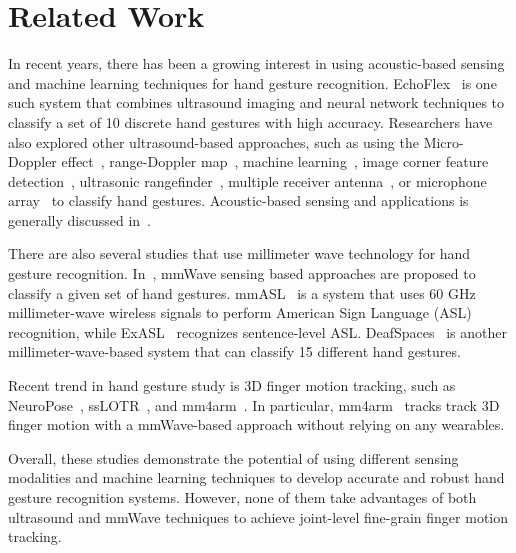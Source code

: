 \documentclass[11pt, oneside]{article}   	%
\begin{document}
\section{Related Work}
In recent years, there has been a growing interest in using acoustic-based sensing and machine learning techniques for hand gesture recognition. EchoFlex~\cite{ref:echoflex17} is one such system that combines ultrasound imaging and neural network techniques to classify a set of 10 discrete hand gestures with high accuracy. Researchers have also explored other ultrasound-based approaches, such as using the Micro-Doppler effect~\cite{ref:usgr19}, range-Doppler map~\cite{ref:hgr22}, machine learning~\cite{ref:mhgr18}, image corner feature detection~\cite{ref:usgdr21}, ultrasonic rangefinder~\cite{ref:ss12}, multiple receiver antenna~\cite{ref:usgr18}, or microphone array~\cite{ref:usgr17} to classify hand gestures.  Acoustic-based sensing and applications is generally discussed in~\cite{ref:absa20}. 

There are also several studies that use millimeter wave technology for hand gesture recognition. In~\cite{ref:hgrmmv21, ref:slgrmmw22}, mmWave sensing based approaches are proposed to classify a given set of hand gestures. mmASL~\cite{ref:mmasl} is a system that uses 60 GHz millimeter-wave wireless signals to perform American Sign Language (ASL) recognition, while ExASL~\cite{ref:exasl20} recognizes sentence-level ASL. DeafSpaces~\cite{ref:deafspaces21} is another millimeter-wave-based system that can classify 15 different hand gestures. 

Recent trend in hand gesture study is 3D finger motion tracking, such as NeuroPose~\cite{ref:neuropose21}, ssLOTR~\cite{ref:sslotr22}, and mm4arm~\cite{ref:mm4arm23}. In particular, mm4arm~\cite{ref:mm4arm23} tracks track 3D finger motion with a mmWave-based approach without relying on any wearables.


Overall, these studies demonstrate the potential of using different sensing modalities and machine learning techniques to develop accurate and robust hand gesture recognition systems. However, none of them take advantages of both ultrasound and mmWave techniques to achieve joint-level fine-grain finger motion tracking.




\end{document}
